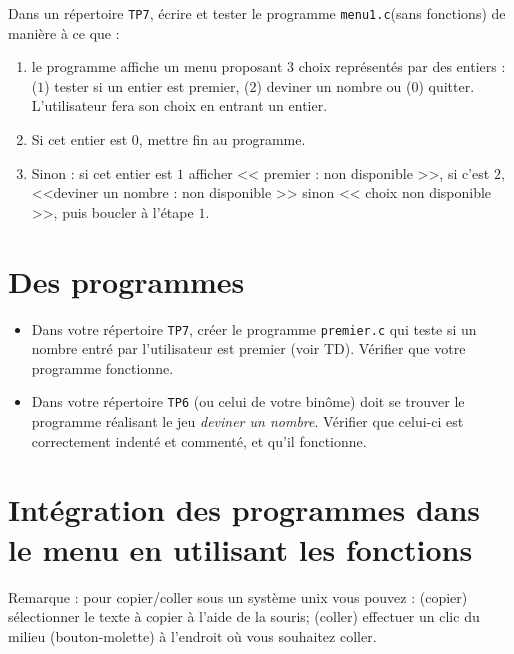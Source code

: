 
 Dans un répertoire \verb|TP7|, écrire et
tester le programme \verb|menu1.c|(sans fonctions) de manière à ce que :
\begin{enumerate}\item 
  le programme affiche un menu proposant $3$ choix représentés par des
  entiers : ($1$) tester si un entier est premier, ($2$) deviner un nombre ou ($0$)
  quitter. L'utilisateur fera son choix en entrant un entier.
\item Si cet entier est $0$, mettre fin au programme. 
\item Sinon : si cet entier est $1$ afficher << premier : non
  disponible >>, si c'est $2$, <<deviner un nombre : non disponible >> sinon
  << choix non disponible >>, puis boucler à l'étape $1$.
\end{enumerate}

\section{Des programmes}
\begin{itemize}
\item Dans votre répertoire \verb|TP7|, créer le programme
  \verb|premier.c| qui teste si un nombre entré par l'utilisateur est
  premier (voir TD). Vérifier que votre programme fonctionne.
\item Dans votre répertoire \verb|TP6| (ou celui de votre binôme) doit se
  trouver le programme réalisant le jeu \emph{deviner un nombre}. Vérifier que celui-ci
  est correctement indenté et commenté, et qu'il fonctionne.
\end{itemize}

\section{Intégration des programmes dans le menu en utilisant les fonctions}
Remarque : pour copier/coller sous un système unix vous pouvez :
(copier) sélectionner le texte à copier à l'aide de la souris;
(coller) effectuer un clic du milieu (bouton-molette) à l'endroit où
vous souhaitez coller.


